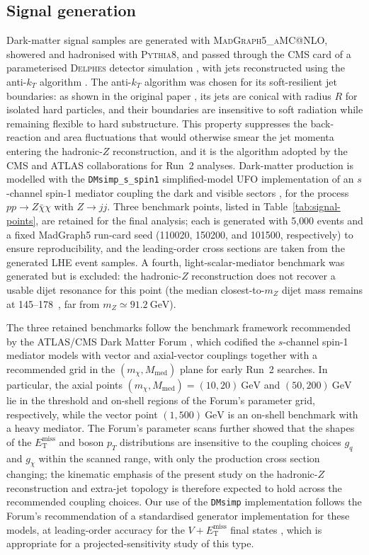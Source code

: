 \documentclass[11pt,a4paper,twocolumn]{article}
\newcommand{\GeV}{\text{GeV}}
\newcommand{\MET}{\ensuremath{E_{\mathrm{T}}^{\mathrm{miss}}}}
\begin{document}
\subsection{Signal generation}

Dark-matter signal samples are generated with \textsc{MadGraph5\_aMC@NLO},
showered and hadronised with \textsc{Pythia8}, and passed through the CMS
card of a parameterised \textsc{Delphes} detector simulation
\cite{alwall_mg5amc,sjostrand_pythia82,delphes3}, with jets reconstructed
using the anti-$k_T$ algorithm \cite{cacciari_antikt}. The anti-$k_T$
algorithm was chosen for its soft-resilient jet boundaries: as shown in the
original paper \cite{cacciari_antikt}, its jets are conical with radius $R$
for isolated hard particles, and their boundaries are insensitive to soft
radiation while remaining flexible to hard substructure. This property
suppresses the back-reaction and area fluctuations that would otherwise
smear the jet momenta entering the hadronic-$Z$ reconstruction, and it is
the algorithm adopted by the CMS and ATLAS collaborations for Run~2
analyses. Dark-matter production is modelled with the
\texttt{DMsimp\_s\_spin1} simplified-model UFO implementation of an
$s$-channel spin-1 mediator coupling the dark and visible sectors
\cite{abercrombie_dm_forum,backovic_schannel}, for the process
$pp \to Z\bar{\chi}\chi$ with $Z \to jj$. Three benchmark points,
listed in Table~\ref{tab:signal-points}, are retained for the final
analysis; each is generated with 5{,}000 events and a fixed MadGraph5
run-card seed (110020, 150200, and 101500, respectively) to ensure
reproducibility, and the leading-order cross sections are taken from the
generated LHE event samples. A fourth, light-scalar-mediator benchmark was
generated but is excluded: the hadronic-$Z$ reconstruction does not recover
a usable dijet resonance for this point (the median closest-to-$m_Z$ dijet
mass remains at 145--178~\GeV, far from $m_Z \simeq 91.2~\GeV$).

The three retained benchmarks follow the benchmark framework recommended by
the ATLAS/CMS Dark Matter Forum \cite{abercrombie_dm_forum}, which
codified the $s$-channel spin-1 mediator models with vector and axial-vector
couplings together with a recommended grid in the
$(m_\chi, M_{\mathrm{med}})$ plane for early Run~2 searches. In
particular, the axial points $(m_\chi, M_{\mathrm{med}}) = (10, 20)~\GeV$
and $(50, 200)~\GeV$ lie in the threshold and on-shell regions of the
Forum's parameter grid, respectively, while the vector point
$(1, 500)~\GeV$ is an on-shell benchmark with a heavy mediator. The Forum's
parameter scans further showed that the shapes of the \MET{} and boson
$p_T$ distributions are insensitive to the coupling choices $g_q$ and
$g_\chi$ within the scanned range, with only the production cross section
changing; the kinematic emphasis of the present study on the hadronic-$Z$
reconstruction and extra-jet topology is therefore expected to hold across
the recommended coupling choices. Our use of the \texttt{DMsimp}
implementation follows the Forum's recommendation of a standardised
generator implementation for these models, at leading-order accuracy for
the $V + \MET$ final states \cite{backovic_schannel,abercrombie_dm_forum},
which is appropriate for a projected-sensitivity study of this type.
\end{document}
